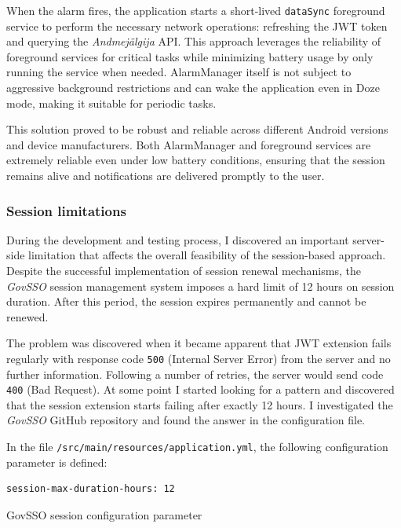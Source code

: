 When the alarm fires, the application starts a short-lived \texttt{dataSync} foreground service to perform the necessary network operations: refreshing the JWT token and querying the \textit{Andmejälgija} API. This approach leverages the reliability of foreground services for critical tasks while minimizing battery usage by only running the service when needed. AlarmManager itself is not subject to aggressive background restrictions and can wake the application even in Doze mode, making it suitable for periodic tasks.

This solution proved to be robust and reliable across different Android versions and device manufacturers. Both AlarmManager and foreground services are extremely reliable even under low battery conditions, ensuring that the session remains alive and notifications are delivered promptly to the user.

\subsubsection{Session limitations}
\label{session-limitations}
During the development and testing process, I discovered an important server-side limitation that affects the overall feasibility of the session-based approach. Despite the successful implementation of session renewal mechanisms, the \textit{GovSSO} session management system imposes a hard limit of 12 hours on session duration. After this period, the session expires permanently and cannot be renewed.

The problem was discovered when it became apparent that JWT extension fails regularly with response code \texttt{500} (Internal Server Error) from the server and no further information. Following a number of retries, the server would send code \texttt{400} (Bad Request). At some point I started looking for a pattern and discovered that the session extension starts failing after exactly 12 hours. I investigated the \textit{GovSSO} GitHub repository \cite{govsso-session} and found the answer in the configuration file.

In the file \texttt{/src/main/resources/application.yml}, the following configuration parameter is defined:

\begin{listing}[H]
\begin{verbatim}
session-max-duration-hours: 12
\end{verbatim}
\caption{GovSSO session configuration parameter}
\label{lst:govsso-config}
\end{listing}

